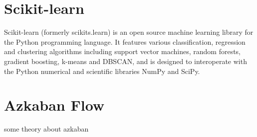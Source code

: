 \section{Scikit-learn}

Scikit-learn (formerly scikits.learn) is an open source machine learning library for the Python programming language. It features various classification, regression and clustering algorithms including support vector machines, random forests, gradient boosting, k-means and DBSCAN, and is designed to interoperate with the Python numerical and scientific libraries NumPy and SciPy.

\section{Azkaban Flow}
some theory about azkaban


